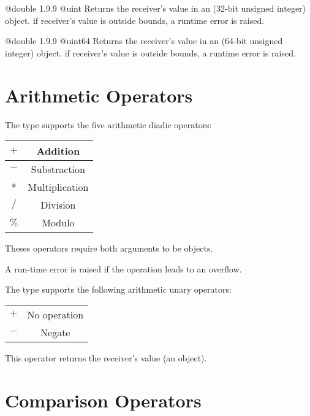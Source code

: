 {@double}
{1.9.9}
{@uint}
{Returns the receiver's value in an  (32-bit unsigned integer) object.}
{if receiver's value is outside  bounds, a runtime error is raised.}





{@double}
{1.9.9}
{@uint64}
{Returns the receiver's value in an  (64-bit unsigned integer) object.}
{if receiver's value is outside  bounds, a runtime error is raised.}




\section{Arithmetic Operators}

The  type supports the five arithmetic diadic operators:\newline

\begin{tabular}{|c|c|}
\hline
$+$ & Addition \\
\hline
$-$ & Substraction \\
\hline
$*$ & Multiplication \\
\hline
$/$ & Division \\
\hline
$\%$ & Modulo \\
\hline
\end{tabular}

Theses operators require both arguments to be  objects.\newline

A run-time error is raised if the operation leads to an overflow.

The  type supports the following arithmetic unary operators:\newline

\begin{tabular}{|c|c|}
\hline
$+$ & No operation \\
$-$ & Negate \\
\hline
\end{tabular}

This operator returns the receiver's value (an  object).






\section{Comparison Operators}

